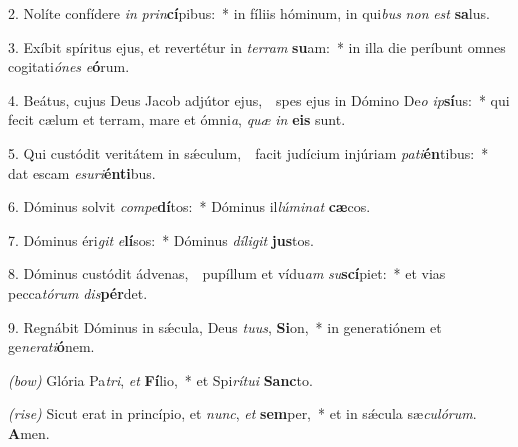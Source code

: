 2. Nolíte confídere \textit{in} \textit{prin}\textbf{cí}pibus:~*
	in fíliis hóminum, in qui\textit{bus} \textit{non} \textit{est} \textbf{sa}lus.

3. Exíbit spíritus ejus, et revertétur in \textit{ter}\textit{ram} \textbf{su}am:~*
	in illa die períbunt omnes cogitati\textit{ó}\textit{nes} \textit{e}\textbf{ó}rum.

4. Beátus, cujus Deus Jacob adjútor ejus,~\GreDagger\
	spes ejus in Dómino De\textit{o} \textit{ip}\textbf{sí}us:~*
	qui fecit cælum et terram, mare et ómni\textit{a}, \textit{quæ} \textit{in} \textbf{e}\textbf{is} sunt.

5. Qui custódit veritátem in s\'{\ae}cu\-lum,~\GreDagger\
	facit judícium injúriam \textit{pa}\textit{ti}\-\textbf{én}tibus:~*
	dat escam \textit{e}\textit{su}\textit{ri}\textbf{én}\textbf{ti}bus.

6. Dóminus solvit \textit{com}\textit{pe}\textbf{dí}tos:~*
	Dóminus il\textit{lú}\textit{mi}\textit{nat} \textbf{cæ}cos.

7. Dóminus éri\textit{git} \textit{e}\textbf{lí}sos:~*
	Dóminus \textit{dí}\textit{li}\textit{git} \textbf{jus}tos.

8. Dóminus custódit ádvenas,~\GreDagger\
	pupíllum et vídu\textit{am} \textit{su}\textbf{scí}piet:~*
	et vias pecca\textit{tó}\textit{rum} \textit{dis}\textbf{pér}det.

9. Regnábit Dóminus in s\'{\ae}cula, Deus \textit{tu}\textit{us}, \textbf{Si}on,~*
	in generatiónem et ge\textit{ne}\textit{ra}\textit{ti}\textbf{ó}nem.

\textit{(bow)} Glória Pa\textit{tri}, \textit{et} \textbf{Fí}lio,~*
	et Spi\textit{rí}\textit{tu}\textit{i} \textbf{Sanc}to.

\textit{(rise)} Sicut erat in princípio, et \textit{nunc}, \textit{et} \textbf{sem}per,~*
	et in s\'{\ae}cula sæ\textit{cu}\textit{ló}\textit{rum}. \textbf{A}men.
